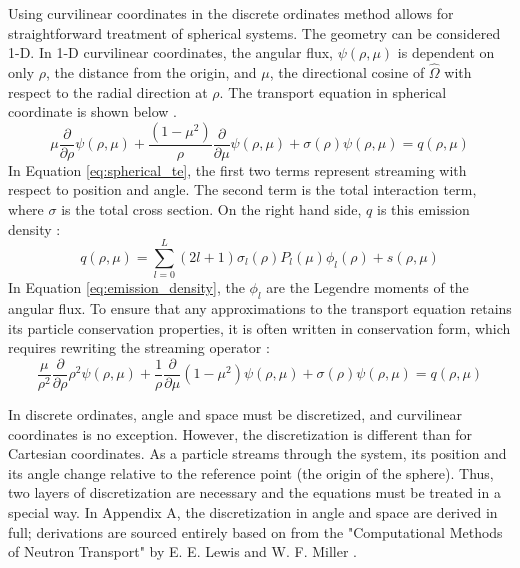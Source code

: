 \documentclass[11pt, oneside]{article}   	%
\begin{document}
Using curvilinear coordinates in the discrete ordinates method allows for straightforward treatment of spherical systems. The geometry can be considered 1-D. In 1-D curvilinear coordinates, the angular flux, $\psi(\rho, \mu)$ is dependent on only $\rho$, the distance from the origin, and $\mu$, the directional cosine of $\hat{\Omega}$ with respect to the radial direction at $\rho$. The transport equation in spherical coordinate is shown below \cite{lm}.
%
\begin{equation}\label{eq:spherical_te}
	\mu\frac{\partial}{\partial\rho}\psi(\rho, \mu)+
	\frac{(1-\mu^2)}{\rho}\frac{\partial}{\partial\mu}\psi(\rho, \mu)+
	\sigma(\rho)\psi(\rho, \mu) = 
	q(\rho, \mu)
\end{equation}
%
In Equation \ref{eq:spherical_te}, the first two terms represent streaming with respect to position and angle. The second term is the total interaction term, where $\sigma$ is the total cross section. On the right hand side, $q$ is this emission density \cite{lm}:
%
\begin{equation}\label{eq:emission_density}
q(\rho, \mu) = \sum_{l=0}^{L}(2l+1)\sigma_l(\rho)P_l(\mu)\phi_l(\rho)+s(\rho, \mu)
\end{equation}
%
In Equation \ref{eq:emission_density}, the $\phi_l$ are the Legendre moments of the angular flux. To ensure that any approximations to the transport equation retains its particle conservation properties, it is often written in conservation form, which requires rewriting the streaming operator \cite{lm}:
%
\begin{equation}\label{eq:conservation_te}
	\frac{\mu}{\rho^2}\frac{\partial}{\partial\rho}\rho^2\psi(\rho, \mu)+
	\frac{1}{\rho}\frac{\partial}{\partial\mu}(1-\mu^2)\psi(\rho, \mu)+
	\sigma(\rho)\psi(\rho, \mu) = 
	q(\rho, \mu)
\end{equation}
%

In discrete ordinates, angle and space must be discretized, and curvilinear coordinates is no exception. However, the discretization is different than for Cartesian coordinates. As a particle streams through the system, its position and its angle change relative to the reference point (the origin of the sphere). Thus, two layers of discretization are necessary and the equations must be treated in a special way. In Appendix A, the discretization in angle and space are derived in full; derivations are sourced entirely  based on from the "Computational Methods of Neutron Transport" by E. E. Lewis and W. F. Miller \cite{lm}. 
\end{document}
